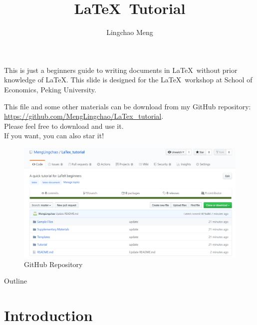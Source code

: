 \documentclass[11pt]{beamer}
\begin{document}
	
	\begin{CJK*}{UTF8}{gkai}
		
	\author[LC Meng]{Lingchao Meng}
	\title[LaTeX Tutorial]{\LaTeX\ Tutorial}
\begin{frame}
    \maketitle
\end{frame}

\begin{frame}
	This is  just a beginners guide to writing documents in \LaTeX\ without prior knowledge of \LaTeX. This slide is designed for the \LaTeX\ workshop at School of Economics, Peking University.
\end{frame}

\begin{frame}
	This file and some other materials can be download from my GitHub repository: \underline{https://github.com/MengLingchao/LaTex\_tutorial}. \\Please feel free to download and use it.\\
	If you want, you can also star it!
	\begin{figure}
		\centering
		\includegraphics[width=0.7\linewidth]{figs/GitHub}
		\caption{GitHub Repository}
		\label{fig:github}
	\end{figure}
	
\end{frame}

\begin{frame}{Outline}
	\tableofcontents
\end{frame}

\section{Introduction}
\begin{frame}
	\sectionpage
\end{frame}


\end{CJK*}
\end{document}
